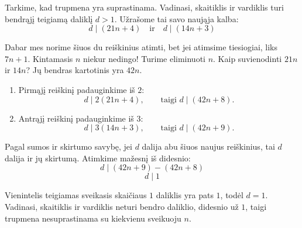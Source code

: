 \documentclass[11pt,a4paper]{scrartcl}
\begin{document}
\begin{solution}
Tarkime, kad trupmena yra suprastinama. Vadinasi, skaitiklis ir vardiklis turi bendrąjį teigiamą daliklį \(d>1\). 
Užrašome tai savo naująja kalba:
\begin{equation*} 
d \mid (21n + 4) \quad \text{ir} \quad d \mid (14n + 3) 
\end{equation*}

Dabar mes norime šiuos du reiškinius atimti, bet jei atimsime tiesiogiai, liks \(7n + 1\). Kintamasis \(n\) niekur nedingo!
Turime eliminuoti \(n\). Kaip suvienodinti $21n$ ir $14n$? Jų bendras kartotinis yra $42n$.

\begin{enumerate}
    \item Pirmąjį reiškinį padauginkime iš $2$:
    \begin{equation*}
        d\mid 2(21n+4),\qquad\text{taigi }d\mid(42n+8).
    \end{equation*}
    \item Antrąjį reiškinį padauginkime iš $3$:
    \begin{equation*}
        d\mid 3(14n+3),\qquad\text{taigi }d\mid(42n+9).
    \end{equation*}
\end{enumerate}

Pagal sumos ir skirtumo savybę, jei \(d\) dalija abu šiuos naujus reiškinius, tai \(d\) dalija ir jų skirtumą. Atimkime mažesnį iš didesnio:
\begin{equation*} 
d \mid (42n + 9) - (42n + 8) 
\end{equation*}
\begin{equation*} 
d \mid 1 
\end{equation*}

Vienintelis teigiamas sveikasis skaičiaus $1$ daliklis yra pats $1$, todėl \(d=1\). Vadinasi, skaitiklis ir vardiklis neturi bendro daliklio, didesnio už $1$, taigi trupmena nesuprastinama su kiekvienu sveikuoju \(n\).
\end{solution}
\vspace{0.5cm}
\end{document}
